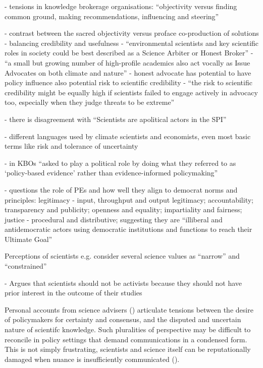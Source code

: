 \cite{MacKillopCDD2023} - tensions in knowledge brokerage organisations: ``objectivity versus finding common ground, making recommendations, influencing and steering''

\cite{WesselinkH2020} - contrast between the sacred objectivity versus proface co-production of solutions - balancing credibility and usefulness
\cite{GregoryBW2024} - ``environmental scientists and key scientific roles in society could be best described as a Science Arbiter or Honest Broker''
\cite{GregoryBW2024} - ``a small but growing number of high-profile academics also act vocally as Issue Advocates on both climate and nature''
\cite{GregoryBW2024} - honest advocate has potential to have policy influence also potential risk to scientific credibility
\cite{GregoryBW2024} - ``the risk to scientific credibility might be equally high if scientists failed to engage actively in advocacy too, especially when they judge threats to be extreme''

\cite{JagannathanEtAl2023} - there is disagreement with ``Scientists are apolitical actors in the SPI''

\cite{Makin2024} - different languages used by climate scientists and economists, even most basic terms like risk and tolerance of uncertainty

\cite{MacKillopCDD2023} - in KBOs ``asked to play a political role by doing what they referred to as `policy-based evidence' rather than evidence-informed policymaking''

\cite{vonMalmborg2024strategies} - questions the role of PEs and how well they align to democrat norms and principles: legitimacy - input, throughput and output legitimacy; accountability; transparency and publicity; openness and equality; impartiality and fairness; justice - procedural and distributive; suggesting they are ``illiberal and antidemocratic actors using democratic institutions and functions to reach their Ultimate Goal''

Perceptions of scientists e.g. \cite{McNiePS2017} consider several science values as ``narrow'' and ``constrained''

\cite{Buntgen2024} - Argues that scientists should not be activists because they should not have prior interest in the outcome of their studies

Personal accounts from science advisers (\cite{Stirling2010,Hicks2024}) articulate  tensions between the desire of policymakers for certainty and consensus, and the disputed and uncertain nature of scientifc knowledge. Such pluralities of perspective may be difficult to reconcile in policy settings that demand communications in a condensed form. This is not simply frustrating, scientists and science itself can be reputationally damaged when nuance is insufficiently communicated (\cite{Stirling2010,OjanenBKP2021}). 

